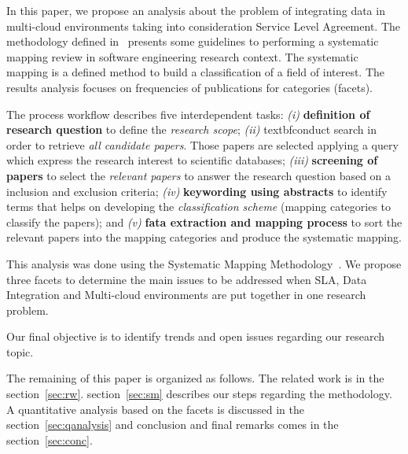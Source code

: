 In this paper, we propose an analysis about the problem of integrating data in multi-cloud environments taking into consideration Service Level Agreement. 
The methodology defined in~\cite{SM:Petersen:2008} presents some guidelines to
performing a systematic mapping review in software engineering research
context. The systematic mapping is a defined method to build
a classification of a field of interest. The results analysis focuses on
frequencies of publications for categories (facets).  

The process workflow describes five interdependent tasks: \textit{(i)}
\textbf{definition of research question} to define the \textit{research scope}; \textit{(ii)} textbf{conduct search} in order to retrieve \textit{all candidate papers}. Those papers are selected applying a query which
express the research interest to scientific databases; \textit{(iii)}
\textbf{screening of papers} to select the \textit{relevant papers} to answer the research
question based on a inclusion and exclusion criteria; \textit{(iv)}
\textbf{keywording using abstracts} to identify terms that helps on developing the
\textit{classification scheme} (mapping categories to classify the papers); and
\textit{(v)} \textbf{fata extraction and mapping process} to sort the relevant
papers into the mapping categories and produce the systematic mapping.


This analysis was done using the Systematic Mapping Methodology~\cite{SM:Petersen:2008}. We propose three facets to determine the main issues to be addressed when SLA, Data Integration and Multi-cloud environments are put together in one research problem.



Our final objective is to identify trends and open issues regarding our research topic.

The remaining of this paper is organized as follows. 
The related work is in the section~\ref{sec:rw}. 
section~\ref{sec:sm} describes our steps regarding the methodology.
A quantitative analysis based on the facets is discussed in the section~\ref{sec:qanalysis} and conclusion and final
remarks comes in the section~\ref{sec:conc}. 